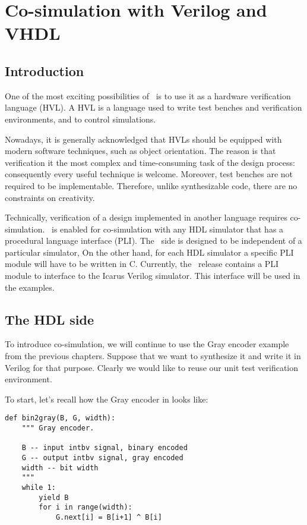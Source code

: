 \chapter{Co-simulation with Verilog and VHDL \label{cosim}}

\section{Introduction \label{cosim-intro}}

One of the most exciting possibilities of \myhdl\
is to use it as a hardware verification language (HVL).
A HVL is a language used to write test benches and
verification environments, and to control simulations.

Nowadays, it is generally acknowledged that HVLs should be equipped
with modern software techniques, such as object orientation. The
reason is that verification it the most complex and time-consuming
task of the design process: consequently every useful technique is
welcome. Moreover, test benches are not required to be
implementable. Therefore, unlike synthesizable code, there
are no constraints on creativity.

Technically, verification of a design implemented in
another language requires co-simulation. \myhdl\ is 
enabled for co-simulation with any HDL simulator that
has a procedural language interface (PLI). The \myhdl\
side is designed to be independent of a particular
simulator, On the other hand, for each HDL simulator a specific
PLI module will have to be written in C. Currently,
the \myhdl\ release contains a PLI module to interface
to the Icarus Verilog simulator. This interface will
be used in the examples.

\section{The HDL side \label{cosim-hdl}}

To introduce co-simulation, we will continue to use the Gray encoder
example from the previous chapters. Suppose that we want to
synthesize it and write it in Verilog for that purpose. Clearly we would
like to reuse our unit test verification environment. 

To start, let's recall how the Gray encoder in \myhdl{} looks like:

\begin{verbatim}
def bin2gray(B, G, width):
    """ Gray encoder.

    B -- input intbv signal, binary encoded
    G -- output intbv signal, gray encoded
    width -- bit width
    """
    while 1:
        yield B
        for i in range(width):
            G.next[i] = B[i+1] ^ B[i]
\end{verbatim}

